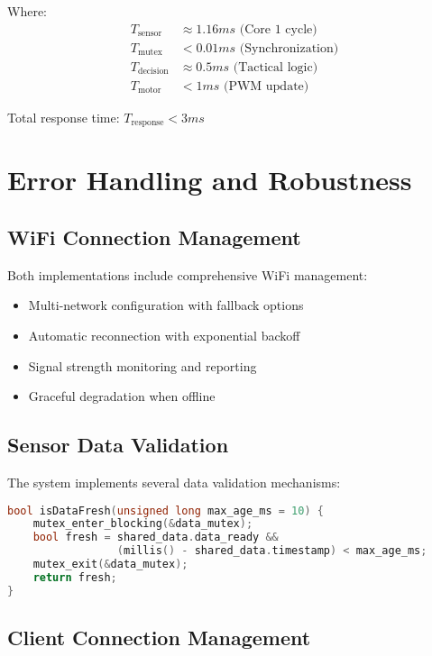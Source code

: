 \documentclass[12pt,a4paper]{article}
\begin{document}
Where:
\begin{align}
T_{\text{sensor}} &\approx 1.16ms \text{ (Core 1 cycle)} \\
T_{\text{mutex}} &< 0.01ms \text{ (Synchronization)} \\
T_{\text{decision}} &\approx 0.5ms \text{ (Tactical logic)} \\
T_{\text{motor}} &< 1ms \text{ (PWM update)}
\end{align}

Total response time: $T_{\text{response}} < 3ms$

\section{Error Handling and Robustness}

\subsection{WiFi Connection Management}

Both implementations include comprehensive WiFi management:

\begin{itemize}
    \item Multi-network configuration with fallback options
    \item Automatic reconnection with exponential backoff
    \item Signal strength monitoring and reporting
    \item Graceful degradation when offline
\end{itemize}

\subsection{Sensor Data Validation}

The system implements several data validation mechanisms:

\begin{lstlisting}[language=C++, caption=Data Freshness Validation]
bool isDataFresh(unsigned long max_age_ms = 10) {
    mutex_enter_blocking(&data_mutex);
    bool fresh = shared_data.data_ready && 
                 (millis() - shared_data.timestamp) < max_age_ms;
    mutex_exit(&data_mutex);
    return fresh;
}
\end{lstlisting}

\subsection{Client Connection Management}
\end{document}
